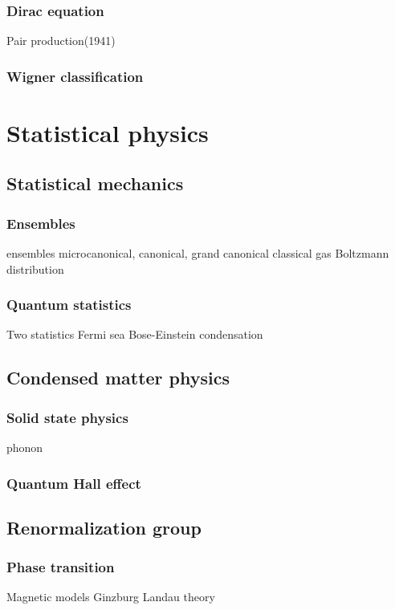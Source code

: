 \documentclass{../../large}
\begin{document}
\section{}
\section{Dirac equation}
Pair production(1941)
\section{Wigner classification}






\part{Statistical physics}

\chapter{Statistical mechanics}
\section{Ensembles}
ensembles
microcanonical, canonical, grand canonical
classical gas
Boltzmann distribution
\section{Quantum statistics}
Two statistics
Fermi sea
Bose-Einstein condensation


\chapter{Condensed matter physics}
\section{Solid state physics}
phonon
\section{Quantum Hall effect}


\chapter{Renormalization group}
\section{Phase transition}
Magnetic models
Ginzburg Landau theory
\end{document}

